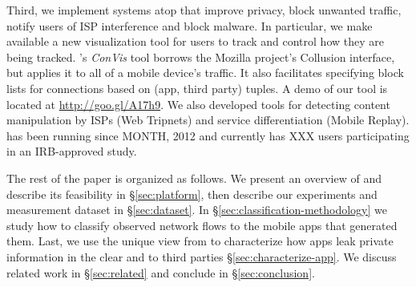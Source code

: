 Third, we implement systems atop \meddle that improve 
privacy, block unwanted traffic, notify users of ISP interference and block malware. 
In particular, we make available a new visualization tool for users to track and control how 
they are being tracked. \platname{}'s \emph{ConVis} tool borrows the Mozilla project's Collusion 
interface, but applies it to all of a mobile device's traffic. It also facilitates specifying block lists for connections
 based on (app, third party) tuples. A demo of our tool is located at \url{http://goo.gl/A17h9}. 
 We also developed tools for detecting content manipulation by ISPs (Web Tripnets) and 
 service differentiation (Mobile Replay). 
\meddle has been running since 
MONTH, 2012 and currently has XXX users participating in an IRB-approved study. 






The rest of the paper is organized as follows. 
We present an overview of \platname and describe its feasibility in \S\ref{sec:platform}, then describe our experiments and measurement dataset in \S\ref{sec:dataset}.
In  \S\ref{sec:classification-methodology} we study how to classify observed network flows to the mobile apps that generated them. Last, we use the 
unique view from \platname to characterize how apps leak private information in the clear and to third parties \S\ref{sec:characterize-app}. 
We discuss related work in \S\ref{sec:related} and conclude in \S\ref{sec:conclusion}.

